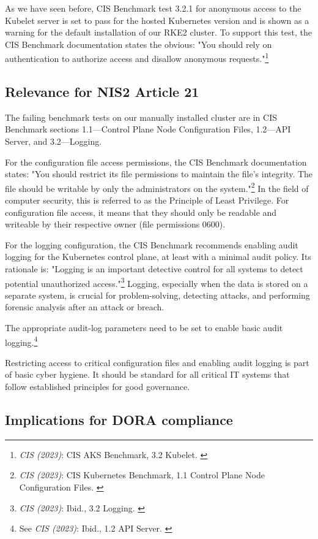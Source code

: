 As we have seen before, CIS Benchmark test 3.2.1 for anonymous access to the Kubelet server is set to pass for the hosted Kubernetes version and is shown as a warning for the default installation of our RKE2 cluster. To support this test, the CIS Benchmark documentation states the obvious: "You should rely on authentication to authorize access and disallow anonymous requests."\footnote{\textit{CIS (2023)}: CIS AKS Benchmark, 3.2 Kubelet. \cite{cisAks}}

\subsection{Relevance for NIS2 Article 21}

The failing benchmark tests on our manually installed cluster are in CIS Benchmark sections 1.1—Control Plane Node Configuration Files, 1.2—API Server, and 3.2—Logging.

For the configuration file access permissions, the CIS Benchmark documentation states: "You should restrict its file permissions to maintain the file's integrity. The file should be writable by only the administrators on the system."\footnote{\textit{CIS (2023)}: CIS Kubernetes Benchmark, 1.1 Control Plane Node Configuration Files. \cite{cisK8s}} In the field of computer security, this is referred to as the Principle of Least Privilege. For configuration file access, it means that they should only be readable and writeable by their respective owner (file permissions 0600).

For the logging configuration, the CIS Benchmark recommends enabling audit logging for the Kubernetes control plane, at least with a minimal audit policy. Its rationale is: "Logging is an important detective control for all systems to detect potential unauthorized access."\footnote{\textit{CIS (2023)}: Ibid., 3.2 Logging. \cite{cisK8s}} Logging, especially when the data is stored on a separate system, is crucial for problem-solving, detecting attacks, and performing forensic analysis after an attack or breach.

The appropriate audit-log parameters need to be set to enable basic audit logging.\footnote{See \textit{CIS (2023)}: Ibid., 1.2 API Server. \cite{cisK8s}}

Restricting access to critical configuration files and enabling audit logging is part of basic cyber hygiene. It should be standard for all critical IT systems that follow established principles for good governance.

\subsection{Implications for DORA compliance}

